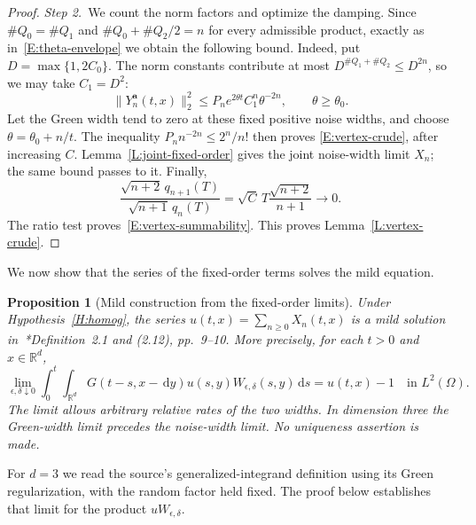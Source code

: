 \documentclass[12pt,oneside,openany]{book}
\makeatletter
\let\lean@pending\@empty
\newcommand{\LeanMarker}[1]{\gdef\lean@pending{#1}}
\numberwithin{equation}{section}
\newtheorem{proposition}[theorem]{Proposition}
\theoremstyle{nogostyle}
\theoremstyle{definition}
\newcommand{\R}{\mathbb{R}}
\newcommand{\ud}{\,\mathrm{d}}
\makeatother
\begin{document}
\begin{proof}
  \medskip
  \noindent\textit{Step 2.~}We count the norm factors and optimize the
  damping.
  Since $\#Q_0 = \#Q_1$ and $\#Q_0+\#Q_2/2 = n$ for every admissible product,
  exactly as in~\eqref{E:theta-envelope} we obtain the following bound. Indeed,
  put $D = \max\{1,2C_0\}$. The norm constants contribute at most
  $D^{\#Q_1+\#Q_2} \le D^{2n}$, so we may take $C_1 = D^2$:
  \[
    \|Y_n^{\boldsymbol a}(t,x)\|_2^2
    \le P_n e^{2\theta t}C_1^n\theta^{-2n},\qquad\theta\ge\theta_0.
  \]
  Let the Green width tend to zero at these fixed positive noise widths, and
  choose $\theta = \theta_0+n/t$. The inequality $P_n n^{-2n} \le 2^n/n!$ then
  proves \eqref{E:vertex-crude}, after increasing $C$.
  Lemma~\ref{L:joint-fixed-order} gives the joint noise-width limit $X_n$; the
  same bound passes to it. Finally,
  \[
    \frac{\sqrt{n+2}\,q_{n+1}(T)}
    {\sqrt{n+1}\,q_n(T)}
    =\sqrt C\,T\frac{\sqrt{n+2}}{n+1}\longrightarrow0.
  \]
  The ratio test proves~\eqref{E:vertex-summability}. This proves
  Lemma~\ref{L:vertex-crude}.
\end{proof}

We now show that the series of the fixed-order terms solves the mild
equation.

\LeanMarker{P:mild-construction}
\begin{proposition}[Mild construction from the fixed-order limits]
  \label{P:mild-construction}
  Under Hypothesis~\ref{H:homog}, the series $u(t,x) = \sum_{n\ge0}X_n(t,x)$ is
  a mild solution in~\cite{chen:author2026:time-dependency}*{Definition~2.1 and
  (2.12), pp.~9--10}. More precisely, for each $t > 0$ and $x \in \R^d$,
  \begin{equation}\label{E:mild-construction}
    \lim_{\epsilon,\delta\downarrow0}
    \int_0^t\int_{\R^d}G(t-s,x-\ud y)
    u(s,y)W_{\epsilon,\delta}(s,y)\ud s
    =u(t,x)-1\quad\text{in }L^2(\Omega).
  \end{equation}
  The limit allows arbitrary relative rates of the two widths. In dimension
  three the Green-width limit precedes the noise-width limit. No uniqueness
  assertion is made.
\end{proposition}

For $d = 3$ we read the source's generalized-integrand definition using its
Green regularization, with the random factor held fixed. The proof below
establishes that limit for the product $uW_{\epsilon,\delta}$.
\end{document}

